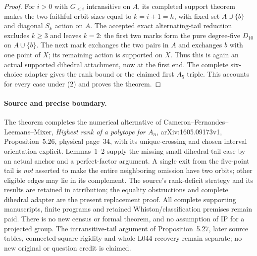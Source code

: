 \documentclass[11pt,a4paper]{article}
\begin{document}
\begin{proof}
For $i>0$ with $G_{<i}$ intransitive on $A$, its completed
support theorem makes the two faithful orbit sizes equal
to $k=i+1=h$, with fixed set $A\cup\{b\}$ and diagonal
$S_k$ action on $A$. The accepted exact alternating-tail
reduction excludes $k\geq3$ and leaves $k=2$: the first
two marks form the pure degree-five $D_{10}$ on
$A\cup\{b\}$. The next mark exchanges the two pairs in
$A$ and exchanges $b$ with one point of $X$; its remaining
action is supported on $X$. Thus this is again an actual
supported dihedral attachment, now at the first end.
The complete six-choice adapter gives the rank bound or
the claimed first $A_5$ triple. This accounts for every
case under (2) and proves the theorem.
\end{proof}

\paragraph{Source and precise boundary.}
The theorem completes the numerical alternative of
Cameron--Fernandes--Leemans--Mixer, \emph{Highest rank of
a polytope for $A_n$}, arXiv:1605.09173v1,
Proposition~5.26, physical page~34, with its unique-crossing
and chosen interval orientation explicit. Lemmas~1--2 supply the missing small dihedral-tail
case by an actual anchor and a perfect-factor argument.
A single exit from the five-point tail is \emph{not} asserted
to make the entire neighboring omission have two orbits;
other eligible edges may lie in its complement. The source's rank-deficit strategy and its results
are retained in attribution; the equality obstructions and
complete dihedral adapter are the present replacement proof.
All complete supporting manuscripts, finite programs and
retained Whiston/classification premises remain paid.
There is no new census or formal theorem, and no assumption
of IP for a projected group. The intransitive-tail argument
of Proposition~5.27, later source tables, connected-square
rigidity and whole L044 recovery remain separate; no new
original or question credit is claimed.
\end{document}
